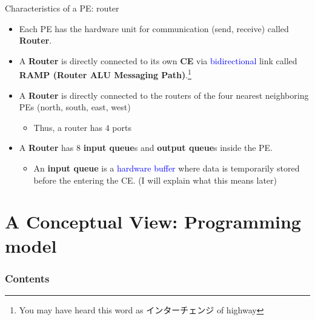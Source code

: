 \documentclass[dvipdfmx, 11pt, aspectratio=169]{beamer}   %
\begin{document}
\begin{frame}{Characteristics of a PE: router}
\begin{itemize}
    \item Each PE has the hardware unit for communication (send, receive) called \textbf{Router}.
    \item A \textbf{Router} is directly connected to its own \textbf{CE} via \textcolor{blue}{bidirectional} link called \textbf{RAMP (Router ALU Messaging Path)}.\footnote{You may have heard this word as インターチェンジ of highway} 
    \item A \textbf{Router} is directly connected to the routers of the four nearest neighboring PEs (north, south, east, west)
    \begin{itemize}
        \item Thus, a router has $4$ ports
    \end{itemize}
    \item A \textbf{Router} has $8$ \textbf{input queue}s and \textbf{output queue}s inside the PE.
    \begin{itemize}
        \item An \textbf{input queue} is a \textcolor{blue}{hardware buffer} where data is temporarily stored before the entering the CE. (I will explain what this means later)
    \end{itemize}
\end{itemize}
\end{frame}
\section{A Conceptual View: Programming model}
\begin{frame}
    \frametitle{Contents}
\end{frame}
\end{document}

